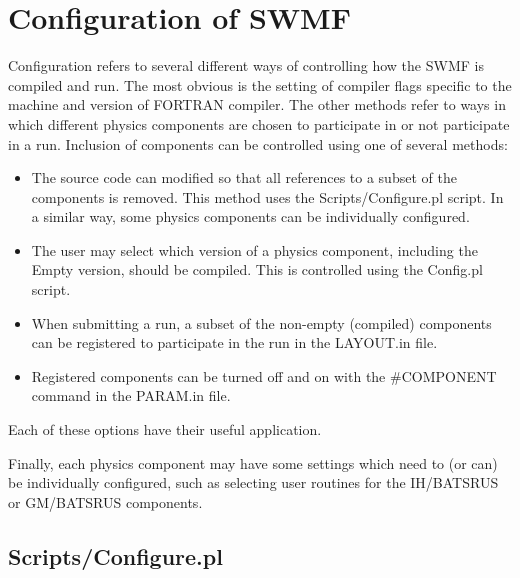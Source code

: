 \section{Configuration of SWMF}

Configuration refers to several different ways of controlling how the 
SWMF is compiled and run.  The most obvious is the setting of
compiler flags specific to the machine and version of FORTRAN
compiler.  The other methods refer to ways in which different physics
components are chosen to participate in or not participate in a run.
Inclusion of components can be controlled using one of several methods:

\begin{itemize}
\item The source code can modified so that all references %
      to a subset of the components is removed. 
      This method uses the Scripts/Configure.pl script.
      In a similar way, some physics components can be individually
      configured.                                         %
\item The user may select which version of a physics component,
      including the Empty version,
      should be compiled.  This is controlled using the Config.pl script.
\item When submitting a run, a subset of the non-empty (compiled) 
      components can be
      registered to participate in the run in the LAYOUT.in file.
\item Registered components can be turned off and on with the \#COMPONENT
      command in the PARAM.in file.
\end{itemize}
Each of these options have their useful application.

Finally, each physics component may have some settings which need to
(or can) be individually
configured, such as selecting user routines for the IH/BATSRUS or
GM/BATSRUS components.

\subsection{Scripts/Configure.pl}

